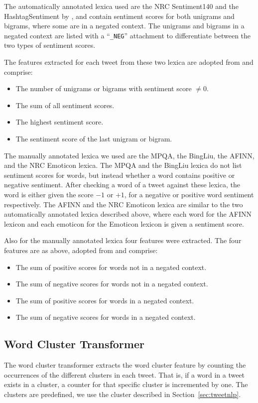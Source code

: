 The automatically annotated lexica used are the NRC Sentiment140 and the HashtagSentiment by \cite{MohammadKZ2013}, and contain sentiment scores for both unigrams and bigrams, where some are in a negated context. The unigrams and bigrams in a negated context are listed with a ``\texttt{\_NEG}'' attachment to differentiate between the two types of sentiment scores.

The features extracted for each tweet from these two lexica are adopted from \cite{FaretReitan} and comprise:
\begin{itemize}
\item The number of unigrams or bigrams with sentiment score $\neq0$.
\item The sum of all sentiment scores.
\item The highest sentiment score.
\item The sentiment score of the last unigram or bigram.
\end{itemize}

The manually annotated lexica we used are the MPQA, the BingLiu, the AFINN, and the NRC Emoticon lexica. The MPQA and the BingLiu lexica do not list sentiment scores for words, but instead whether a word contains positive or negative sentiment. After checking a word of a tweet against these lexica, the word is either given the score $-1$ or $+1$, for a negative or positive word sentiment respectively. The AFINN and the NRC Emoticon lexica are similar to the two automatically annotated lexica described above, where each word for the AFINN lexicon and each emoticon for the Emoticon lexicon is given a sentiment score.

Also for the manually annotated lexica four features were extracted. The four features are as above, adopted from \cite{FaretReitan} and comprise:
\begin{itemize}
\item The sum of positive scores for words not in a negated context.
\item The sum of negative scores for words not in a negated context.
\item The sum of positive scores for words in a negated context.
\item The sum of negative scores for words in a negated context.
\end{itemize}


\subsection*{Word Cluster Transformer}
The word cluster transformer extracts the word cluster feature by counting the occurrences of the different clusters in each tweet. That is, if a word in a tweet exists in a cluster, a counter for that specific cluster is incremented by one. The clusters are predefined, we use the cluster described in Section~\ref{sec:tweetnlp}.

